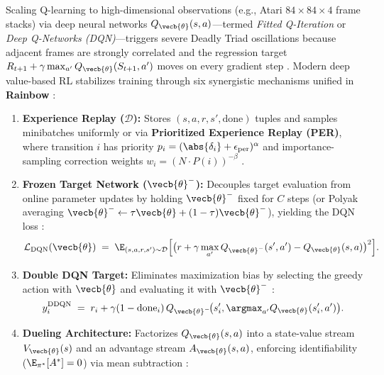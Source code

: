 \documentclass[../../../../master.tex]{subfiles}
\begin{document}
Scaling Q-learning to high-dimensional observations (e.g., Atari $84 \times 84 \times 4$ frame stacks) via deep neural networks $Q_{\vecb{\theta}}(s, a)$---termed \emph{Fitted Q-Iteration} or \emph{Deep Q-Networks (DQN)}---triggers severe Deadly Triad oscillations because adjacent frames are strongly correlated and the regression target $R_{t+1} + \gamma \max_{a'} Q_{\vecb{\theta}}(S_{t+1}, a')$ moves on every gradient step  . Modern deep value-based RL stabilizes training through six synergistic mechanisms unified in \textbf{Rainbow} :
\begin{enumerate}
  \item \textbf{Experience Replay ($\mathcal{D}$):} Stores $(s, a, r, s', \text{done})$ tuples and samples minibatches uniformly or via \textbf{Prioritized Experience Replay (PER)}, where transition $i$ has priority $p_i = (\abs{\delta_i} + \epsilon_{\text{per}})^\alpha$ and importance-sampling correction weights $w_i = (N \cdot P(i))^{-\beta}$ .
  \item \textbf{Frozen Target Network ($\vecb{\theta}^-$):} Decouples target evaluation from online parameter updates by holding $\vecb{\theta}^-$ fixed for $C$ steps (or Polyak averaging $\vecb{\theta}^- \leftarrow \tau \vecb{\theta} + (1 - \tau)\vecb{\theta}^-$), yielding the DQN loss :
  \begin{equation}
    \mathcal{L}_{\mathrm{DQN}}(\vecb{\theta}) \;=\; \E_{(s, a, r, s') \sim \mathcal{D}} \Bigl[\bigl(r + \gamma \max_{a'} Q_{\vecb{\theta}^-}(s', a') - Q_{\vecb{\theta}}(s, a)\bigr)^2\Bigr].
    \label{eq:td:dqn_loss}
  \end{equation}
  \item \textbf{Double DQN Target:} Eliminates maximization bias by selecting the greedy action with $\vecb{\theta}$ and evaluating it with $\vecb{\theta}^-$ :
  \begin{equation}
    y_i^{\mathrm{DDQN}} \;=\; r_i + \gamma (1 - \text{done}_i)\, Q_{\vecb{\theta}^-}\!\bigl(s'_i, \argmax_{a'} Q_{\vecb{\theta}}(s'_i, a')\bigr).
    \label{eq:td:double_dqn_target}
  \end{equation}
  \item \textbf{Dueling Architecture:} Factorizes $Q_{\vecb{\theta}}(s, a)$ into a state-value stream $V_{\vecb{\theta}}(s)$ and an advantage stream $A_{\vecb{\theta}}(s, a)$, enforcing identifiability ($\E_{\pi^*}[A^*] = 0$) via mean subtraction :

\end{enumerate}
\end{document}
